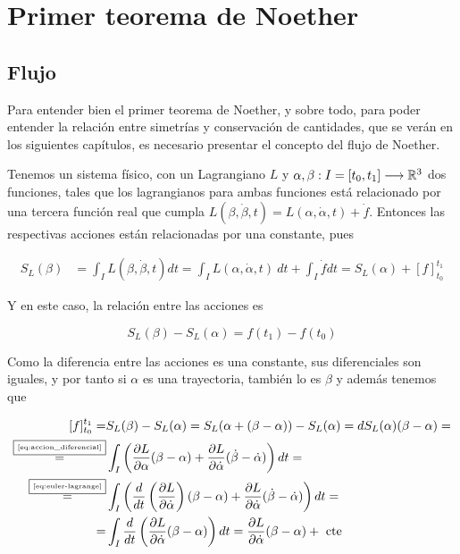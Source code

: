 \chapter{Primer teorema de Noether}

\section{Flujo}

Para entender bien el primer teorema de Noether, y sobre todo, para poder entender la relación entre simetrías y conservación de cantidades, que se verán en los siguientes capítulos, es necesario presentar el concepto del flujo de Noether.

Tenemos un sistema físico, con un Lagrangiano $L$ y $\alpha,\beta:I=[t_0, t_1]\longrightarrow \mathbb{R}^3$ dos funciones, tales que los lagrangianos para ambas funciones está relacionado por una tercera función real que cumpla $L(\beta, \dot{\beta}, t) = L(\alpha, \dot{\alpha}, t)+\dot{f}$.
Entonces las respectivas acciones están relacionadas por una constante, pues

\begin{equation}
	\label{eq:variacion-accion}
	\begin{split}
		S_L(\beta) & = \int_I L(\beta, \dot{\beta}, t) dt = \int_I L(\alpha, \dot{\alpha}, t)\ dt+\int_I \dot{f}dt=S_L(\alpha) +[f]_{t_0}^{t_1}
	\end{split}
\end{equation}

Y en este caso, la relación entre las acciones es

\begin{equation}
	\label{eq:variacion-accion-relacion}
	S_L(\beta) - S_L(\alpha) = f(t_1) - f(t_0)
\end{equation}

Como la diferencia entre las acciones es una constante, sus diferenciales son iguales, y por tanto si $\alpha$ es una trayectoria, también lo es $\beta$ y además tenemos que

\begin{equation}
	\label{eq:diferencial_trayectoria}
	\begin{split}
	[f]
		_{t_0}^{t_1} = & S_L(\beta) - S_L(\alpha) = S_L(\alpha + (\beta-\alpha))-S_L(\alpha)=dS_L(\alpha)(\beta-\alpha)=\\
		\overset{\fbox{\tiny \ref{eq:accion_diferencial}}}{=} & \int_{I}\left( \frac{\partial L}{\partial\alpha}(\beta-\alpha)+\frac{\partial L}{\partial\dot{\alpha}}(\dot{\beta}-\dot{\alpha})\right) dt = \\
		\overset{\fbox{\tiny \ref{eq:euler-lagrange}}}{=} & \int_{I}\left( \frac{d}{dt}\left(\frac{\partial L}{\partial\dot{\alpha}}\right)(\beta-\alpha)+\frac{\partial L}{\partial\dot{\alpha}}(\dot{\beta}-\dot{\alpha})\right) dt=\\
		= & \int_{I}\frac{d}{dt}\left(\frac{\partial L}{\partial\dot{\alpha}}(\beta-\alpha)\right) dt = \frac{\partial L}{\partial\dot{\alpha}}(\beta-\alpha) + \text{ cte }
	\end{split}
\end{equation}

